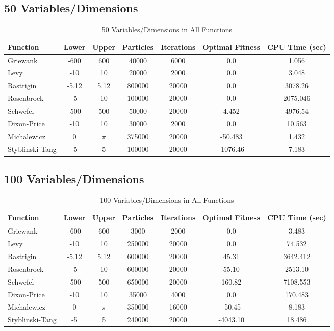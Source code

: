 \documentclass[12pt]{article}
\begin{document}
\subsection{50 Variables/Dimensions}
\begin{table}[H]
    \caption{50 Variables/Dimensions in All Functions}
    \centering
    \begin{tabular}{l c c c c c c}
        \hline
        Function & Lower & Upper & Particles & Iterations & Optimal Fitness & CPU Time (sec) \\
        \hline
        Griewank       & -600  & 600   & 40000  & 6000   & 0.0       & 1.056 \\
        Levy           & -10   & 10    & 20000  & 2000   & 0.0       & 3.048 \\
        Rastrigin      & -5.12 & 5.12  & 800000 & 20000  & 0.0       & 3078.26 \\
        Rosenbrock     & -5    & 10    & 100000 & 20000  & 0.0       & 2075.046 \\
        Schwefel       & -500  & 500   & 50000  & 20000  & 4.452     & 4976.54 \\
        Dixon-Price    & -10   & 10    & 30000  & 2000   & 0.0       & 10.563 \\
        Michalewicz    & 0     & $\pi$ & 375000 & 20000  & -50.483   & 1.432 \\
        Styblinski-Tang & -5   & 5     & 100000 & 20000  & -1076.46  & 7.183 \\
        \hline
    \end{tabular}
\end{table}

\subsection{100 Variables/Dimensions}
\begin{table}[H]
    \caption{100 Variables/Dimensions in All Functions}
    \centering
    \begin{tabular}{l c c c c c c}
        \hline
        Function & Lower & Upper & Particles & Iterations & Optimal Fitness & CPU Time (sec) \\
        \hline
        Griewank       & -600  & 600   & 3000  & 2000   & 0.0       & 3.483 \\
        Levy           & -10   & 10    & 250000 & 20000 & 0.0       & 74.532 \\
        Rastrigin      & -5.12 & 5.12  & 600000 & 20000 & 45.31     & 3642.412 \\
        Rosenbrock     & -5    & 10    & 600000 & 20000 & 55.10     & 2513.10 \\
        Schwefel       & -500  & 500   & 650000 & 20000 & 160.82    & 7108.553 \\
        Dixon-Price    & -10   & 10    & 35000  & 4000  & 0.0       & 170.483 \\
        Michalewicz    & 0     & $\pi$ & 350000 & 16000 & -50.45    & 8.183 \\
        Styblinski-Tang & -5   & 5     & 240000 & 20000 & -4043.10  & 18.486 \\
        \hline
    \end{tabular}
\end{table}
\end{document}
